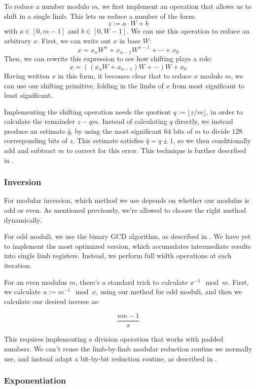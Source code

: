 \documentclass[11pt, a4paper]{article} %
\begin{document}
{To reduce a number modulo $m$, we first implement an operation
that allows us to shift in a single limb. This
lets us reduce a number
of the form:
$$
z := a \cdot W + b
$$
with $a \in [0, m - 1]$ and $b \in [0, W - 1]$. We can use
this operation to reduce an arbitrary $x$. First, we can
write out
$x$ in base $W$:
$$
x = x_n W^n + x_{n -1}W^{n - 1} + \cdots + x_0
$$
Then, we can rewrite this expression to see how
shifting plays a role:
$$
x = ((x_n W + x_{n - 1})W + \cdots)W + x_0
$$
Having written $x$ in this form, it becomes clear that to reduce
$x$ modulo $m$, we can use our shifting primitive, folding
in the limbs of $x$ from most significant to least significant.

Implementing the shifting operation needs
the quotient $q := \lfloor z / m \rfloor$,
in order to calculate the remainder $z - q m$.
Instead of calculating $q$ directly, we instead
produce an estimate $\hat{q}$, by using the most significant
$64$ bits of $m$ to divide $128$ corresponding bits of $z$.
This estimate satisfies $\hat{q} = q \pm 1$, so we then
conditionally add and subtract $m$ to correct
for this error.
This technique is further described in \cite{pornin_bearssl_2020-1}.

\subsubsection{Inversion}

For modular inversion, which method we use depends on whether
our modulus is odd or even. As mentioned previously,
we're allowed to choose the right method dynamically.

For odd moduli, we use
the binary GCD algorithm, as described in \cite{pornin_optimized_2020}.
We have yet to implement the most optimized version, which accumulates
intermediate results into single limb registers. Instead, we
perform full width operations at each iteration.

For an even modulus $m$,
there's a standard trick to calculate $x^{-1} \mod m$.
First, we calculate
$u := m^{-1} \mod x$,
using our method for odd moduli,
and then we calculate our desired inverse as:

$$
\frac{um - 1}{x}
$$

This requires implementing a division operation that works
with padded numbers. We can't reuse the
limb-by-limb modular reduction
routine we normally use, and instead adapt
a bit-by-bit reduction routine, as described in
\cite{pornin_bearssl_2020-1}.

\subsubsection{Exponentiation}

}
\end{document}
